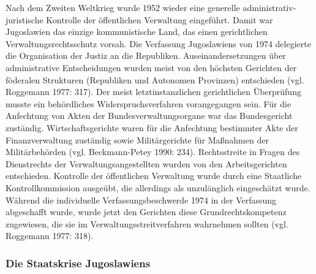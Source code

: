 Nach dem Zweiten Weltkrieg wurde 1952 wieder eine generelle administrativ-juristische Kontrolle der öffentlichen Verwaltung eingeführt. Damit war Jugoslawien das einzige kommunistische Land, das einen gerichtlichen Verwaltungsrechtsschutz vorsah. Die Verfassung Jugoslawiens von 1974 delegierte die Organisation der Justiz an die Republiken. Auseinandersetzungen über administrative Entscheidungen wurden meist von den höchsten Gerichten der föderalen Strukturen (Republiken und Autonomen Provinzen) entschieden (vgl. Roggemann 1977: 317). Der meist letztinstanzlichen gerichtlichen Überprüfung musste ein behördliches Widerspruchsverfahren vorangegangen sein. Für die Anfechtung von Akten der Bundesverwaltungsorgane war das Bundesgericht zuständig. Wirtschaftsgerichte waren für die Anfechtung bestimmter Akte der Finanzverwaltung zuständig sowie Militärgerichte für Maßnahmen der Militärbehörden (vgl. Beckmann-Petey 1990: 234). Rechtsstreite in Fragen des Dienstrechts der Verwaltungsangestellten wurden von den Arbeitsgerichten entschieden. Kontrolle der öffentlichen Verwaltung wurde durch eine Staatliche Kontrollkommission ausgeübt, die allerdings als unzulänglich eingeschätzt wurde. Während die individuelle Verfassungsbeschwerde 1974 in der Verfassung abgeschafft wurde, wurde jetzt den Gerichten diese Grundrechtskompetenz zugewiesen, die sie im Verwaltungsstreitverfahren wahrnehmen sollten (vgl. Roggemann 1977: 318).

\subsubsection{Die Staatskrise Jugoslawiens}

